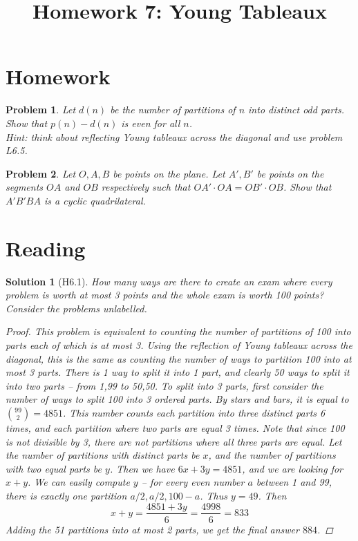 \documentclass[a4paper,12pt]{article}
\title{Homework 7: Young Tableaux}
\theoremstyle{perfect}
\newtheorem{prb}{Problem}
\newtheorem{sol}{Solution}
\begin{document}
 
\maketitle

\section{Homework}

\begin{prb}
Let $d(n)$ be the number of partitions of $n$ into distinct odd parts. Show that $p(n) - d(n)$ is even for all $n$. \\ \textit{Hint: think about reflecting Young tableaux across the diagonal and use problem L6.5.}
\end{prb}

\begin{prb}
Let $O, A, B$ be points on the plane. Let $A', B'$ be points on the segments $OA$ and $OB$ respectively such that $OA'\cdot OA = OB' \cdot OB$. Show that $A'B'BA$ is a cyclic quadrilateral.
\end{prb}

\section{Reading}

\begin{sol}[H6.1]
\textit{How many ways are there to create an exam where every problem is worth at most 3 points and the whole exam is worth 100 points? Consider the problems unlabelled.}
\begin{proof}
This problem is equivalent to counting the number of partitions of 100 into parts each of which is at most 3. Using the reflection of Young tableaux across the diagonal, this is the same as counting the number of ways to partition 100 into at most 3 parts. There is 1 way to split it into 1 part, and clearly 50 ways to split it into two parts -- from 1,99 to 50,50. To split into 3 parts, first consider the number of ways to split 100 into 3 ordered parts. By stars and bars, it is equal to ${99 \choose 2} = 4851$. This number counts each partition into three distinct parts 6 times, and each partition where two parts are equal 3 times. Note that since 100 is not divisible by 3, there are not partitions where all three parts are equal. Let the number of partitions with distinct parts be $x$, and the number of partitions with two equal parts be $y$. Then we have $6x+3y = 4851$, and we are looking for $x+y$. We can easily compute $y$ -- for every even number $a$ between 1 and 99, there is exactly one partition $a/2, a/2, 100-a$. Thus $y = 49$. Then $$x+y = \frac{4851 + 3y}{6} = \frac{4998}{6} = 833$$ Adding the 51 partitions into at most 2 parts, we get the final answer $884$.
\end{proof}
\end{sol}
\end{document}
